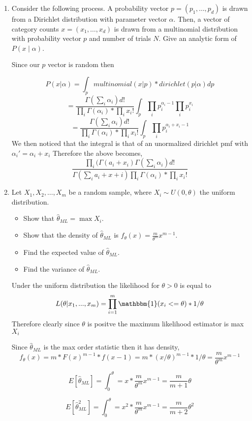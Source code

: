 \documentclass{article}
\begin{document}
\begin{enumerate}
\item
Consider the following process.  A probability vector $p=(p_1, \ldots, p_d)$ is drawn from a Dirichlet distribution with parameter vector $\alpha$.
Then, a vector of category counts $x=(x_1, \ldots, x_d)$ is drawn from a multinomial distribution with probability vector $p$ and number of trials $N$. Give an analytic form of $P(x \mid \alpha)$.  

\color{blue}
Since our $p$ vector is random then

$$P(x | \alpha) = \int_p multinomial(x | p) * dirichlet(p|\alpha) dp $$
$$
=\frac{\Gamma(\sum_i \alpha_i)d!}{\prod_i\Gamma(\alpha_i)*\prod_i x_i !} \int_p \prod_i p_i ^ {\alpha_i -1} \prod_i p_i ^{x_i}
$$
$$
=\frac{\Gamma(\sum_i \alpha_i)d!}{\prod_i\Gamma(\alpha_i)*\prod_i x_i !} \int_p \prod_i p_i ^ {\alpha_i + x_i -1} 
$$
We then noticed that the integral is that of an unormalized dirichlet pmf with $\alpha_i' = \alpha_i + x_i$
Therefore the above becomes,
$$
\frac{\prod_i(\Gamma(a_i + x_i)\Gamma(\sum_i \alpha_i)d!}{\Gamma(\sum_i a_i + x+i) \prod_i\Gamma(\alpha_i)*\prod_i x_i !}
$$

\color{black}
\item
Let $X_1, X_2, \ldots, X_m$ be a random sample, where $X_i \sim U(0,\theta)$ the uniform distribution.
\begin{itemize}
\item Show that $\hat\theta_{ML} = \max X_i$.
\item Show that the density of $\hat\theta_{ML}$ is $f_\theta(x) = \frac{m}{\theta^m} x^{m-1}$.
\item Find the expected value of $\hat\theta_{ML}$.
\item Find the variance of $\hat\theta_{ML}$.
\end{itemize}

\color{blue}
Under the uniform distribution the likelihood for $\theta > 0$ is equal to
$$
L(\theta | x_1, ...,x_m) = \prod_{i = 1}^m \mathbbm{1}(x_i <= \theta) * 1/\theta 
$$
Therefore clearly since $\theta$ is positve the maximum likelihood estimator is max$X_i$

Since $\hat{\theta}_{ML}$ is the max order statistic then it has density,
\[
f_\theta(x) = m * F(x)^{m-1} * f(x-1) = m * (x/\theta)^{m-1} * 1/\theta = \frac{m}{\theta^m}x^{m-1}
\]

\[
E[\hat{\theta}_{ML}] = \int_0^\theta = x * \frac{m}{\theta^m}x^{m-1} = \frac{m}{m+1} \theta
\]

\[
E[\hat{\theta}_{ML}^2] = \int_0^\theta = x^2 * \frac{m}{\theta^m}x^{m-1} = \frac{m}{m+2} \theta ^2
\]


\end{enumerate}
\end{document}
